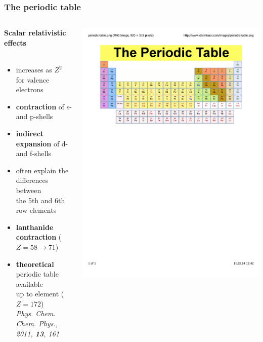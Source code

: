 \documentclass[mathserif,8pt]{beamer}
\begin{document}
\begin{frame}
    \frametitle{The periodic table}
    \begin{columns}
    \begin{column}{.45\textwidth}
	\textbf{Scalar relativistic effects}
	\ \\
	\ \\
	\begin{itemize}
	    \item   increases as $Z^2$ for valence electrons
	    \item   \textbf{contraction} of s- and p-shells
	    \item   \textbf{indirect expansion} of d- and f-shells
	    \item   often explain the differences between\\ 
		    the 5th and 6th row elements
	    \item   \textbf{lanthanide contraction} ($Z=58\rightarrow71$)
	    \item   \textbf{theoretical} periodic table available\\
		    up to element ($Z=172$)\\
		    \scriptsize{\it{Phys. Chem. Chem. Phys.}, 2011, \textbf{13}, 161}
	\end{itemize}
    \end{column}
    \begin{column}{.55\textwidth}
	\centering
	\includegraphics[viewport = 0 500 550 800, clip, scale=0.3]{figures/periodic_table.pdf}\\

\end{column}
\end{columns}
\end{frame}
\end{document}
